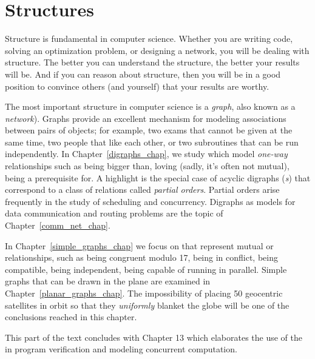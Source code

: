 \part{Structures}
\label{part:structures}

\partintro

Structure is fundamental in computer science.  Whether you are writing
code, solving an optimization problem, or designing a network, you
will be dealing with structure.  The better you can understand the
structure, the better your results will be.  And if you can reason
about structure, then you will be in a good position to convince
others (and yourself) that your results are worthy.

The most important structure in computer science is a \emph{graph},
also known as a \emph{network}).  Graphs provide an excellent
mechanism for modeling associations between pairs of objects; for
example, two exams that cannot be given at the same time, two people
that like each other, or two subroutines that can be run
independently.  In Chapter~\ref{digraphs_chap}, we study
\emph{} which model \emph{one-way} relationships
such as being bigger than, loving (sadly, it's often not mutual),
being a prerequisite for.  A highlight is the special case of acyclic
digraphs (\emph{s}) that correspond to a class of relations
called \emph{partial orders}.  Partial orders arise frequently in the
study of scheduling and concurrency.  Digraphs as models for data
communication and routing problems are the topic of
Chapter~\ref{comm_net_chap}.

In Chapter~\ref{simple_graphs_chap} we focus on \emph{} that represent mutual or \emph{}
relationships, such as being congruent modulo 17, being in conflict,
being compatible, being independent, being capable of running in
parallel.  Simple graphs that can be drawn in the plane are examined
in Chapter~\ref{planar_graphs_chap}.  The impossibility of placing 50
geocentric satellites in orbit so that they \emph{uniformly} blanket
the globe will be one of the conclusions reached in this chapter.

This part of the text concludes with Chapter 13
which elaborates the use of the \emph{} in program
verification and modeling concurrent computation.

\endinput
